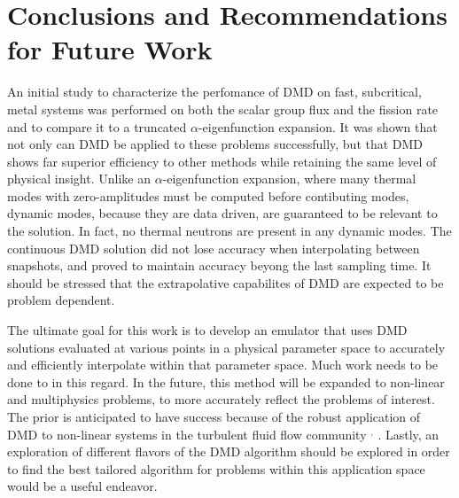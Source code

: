 \documentclass[12pt]{article}
\begin{document}
\section{Conclusions and Recommendations for Future Work}
An initial study to characterize the perfomance of DMD on fast, subcritical, 
	metal systems was performed on both the scalar group flux and the fission 
	rate and to compare it to a truncated $\alpha$-eigenfunction expansion.
It was shown that not only can DMD be applied to these problems successfully,
	but that DMD shows far superior efficiency to other methods while retaining 
	the same level of physical insight.
Unlike an $\alpha$-eigenfunction expansion, where many thermal modes with 
	zero-amplitudes must be computed before contibuting modes, dynamic modes, 
	because they are data driven, are guaranteed to be relevant to the solution.
In fact, no thermal neutrons are present in any dynamic modes.
The continuous DMD solution did not lose accuracy when interpolating between 
	snapshots, and proved to maintain accuracy beyong the last sampling time.
It should be stressed that the extrapolative capabilites of DMD are expected to 
	be problem dependent.

The ultimate goal for this work is to develop an emulator that uses DMD solutions
	evaluated at various points in a physical parameter space to accurately and 
	efficiently interpolate within that parameter space.
Much work needs to be done to in this regard.
In the future, this method will be expanded to non-linear and multiphysics problems, to more 
	accurately reflect the problems of interest.
The prior is anticipated to have success because of the robust application of DMD to non-linear 
	systems in the turbulent fluid flow community \cite{dmd2016}$^,$\cite{schmid2010} .
Lastly, an exploration of different flavors of the DMD algorithm should be 
	explored in order to find the best tailored algorithm for problems within 
	this application space would be a useful endeavor.


\setlength{\baselineskip}{12pt}


\end{document}
